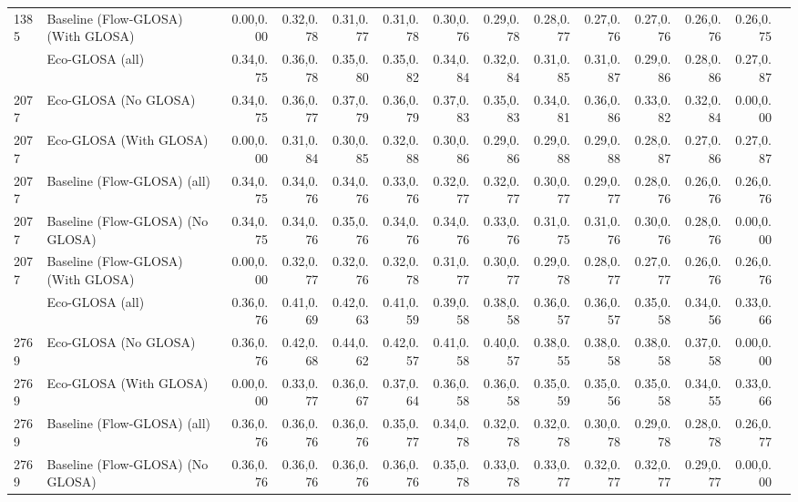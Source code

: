 \begin{table}[ht]
{\begin{tabular}{llrrrrrrrrrrrr}
        1385 & Baseline (Flow-GLOSA) (With GLOSA) & 0.00,0.00 & 0.32,0.78 & 0.31,0.77 & 0.31,0.78 & 0.30,0.76 & 0.29,0.78 & 0.28,0.77 & 0.27,0.76 & 0.27,0.76 & 0.26,0.76 & 0.26,0.75 \\
        \addlinespace
        2077 & Eco-GLOSA (all)                    & 0.34,0.75 & 0.36,0.78 & 0.35,0.80 & 0.35,0.82 & 0.34,0.84 & 0.32,0.84 & 0.31,0.85 & 0.31,0.87 & 0.29,0.86 & 0.28,0.86 & 0.27,0.87 \\
        2077 & Eco-GLOSA (No GLOSA)               & 0.34,0.75 & 0.36,0.77 & 0.37,0.79 & 0.36,0.79 & 0.37,0.83 & 0.35,0.83 & 0.34,0.81 & 0.36,0.86 & 0.33,0.82 & 0.32,0.84 & 0.00,0.00 \\
        2077 & Eco-GLOSA (With GLOSA)             & 0.00,0.00 & 0.31,0.84 & 0.30,0.85 & 0.32,0.88 & 0.30,0.86 & 0.29,0.86 & 0.29,0.88 & 0.29,0.88 & 0.28,0.87 & 0.27,0.86 & 0.27,0.87 \\
        2077 & Baseline (Flow-GLOSA) (all)        & 0.34,0.75 & 0.34,0.76 & 0.34,0.76 & 0.33,0.76 & 0.32,0.77 & 0.32,0.77 & 0.30,0.77 & 0.29,0.77 & 0.28,0.76 & 0.26,0.76 & 0.26,0.76 \\
        2077 & Baseline (Flow-GLOSA) (No GLOSA)   & 0.34,0.75 & 0.34,0.76 & 0.35,0.76 & 0.34,0.76 & 0.34,0.76 & 0.33,0.76 & 0.31,0.75 & 0.31,0.76 & 0.30,0.76 & 0.28,0.76 & 0.00,0.00 \\
        2077 & Baseline (Flow-GLOSA) (With GLOSA) & 0.00,0.00 & 0.32,0.77 & 0.32,0.76 & 0.32,0.78 & 0.31,0.77 & 0.30,0.77 & 0.29,0.78 & 0.28,0.77 & 0.27,0.77 & 0.26,0.76 & 0.26,0.76 \\
        \addlinespace
        2769 & Eco-GLOSA (all)                    & 0.36,0.76 & 0.41,0.69 & 0.42,0.63 & 0.41,0.59 & 0.39,0.58 & 0.38,0.58 & 0.36,0.57 & 0.36,0.57 & 0.35,0.58 & 0.34,0.56 & 0.33,0.66 \\
        2769 & Eco-GLOSA (No GLOSA)               & 0.36,0.76 & 0.42,0.68 & 0.44,0.62 & 0.42,0.57 & 0.41,0.58 & 0.40,0.57 & 0.38,0.55 & 0.38,0.58 & 0.38,0.58 & 0.37,0.58 & 0.00,0.00 \\
        2769 & Eco-GLOSA (With GLOSA)             & 0.00,0.00 & 0.33,0.77 & 0.36,0.67 & 0.37,0.64 & 0.36,0.58 & 0.36,0.58 & 0.35,0.59 & 0.35,0.56 & 0.35,0.58 & 0.34,0.55 & 0.33,0.66 \\
        2769 & Baseline (Flow-GLOSA) (all)        & 0.36,0.76 & 0.36,0.76 & 0.36,0.76 & 0.35,0.77 & 0.34,0.78 & 0.32,0.78 & 0.32,0.78 & 0.30,0.78 & 0.29,0.78 & 0.28,0.78 & 0.26,0.77 \\
        2769 & Baseline (Flow-GLOSA) (No GLOSA)   & 0.36,0.76 & 0.36,0.76 & 0.36,0.76 & 0.36,0.76 & 0.35,0.78 & 0.33,0.78 & 0.33,0.77 & 0.32,0.77 & 0.32,0.77 & 0.29,0.77 & 0.00,0.00 \\

\end{tabular}}
\end{table}
